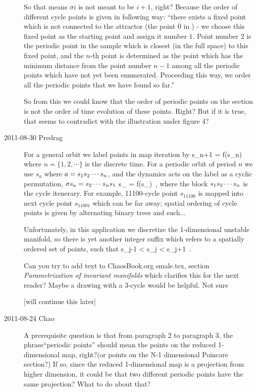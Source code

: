 \begin{description}
So that means $\sigma i$ is not meant to be $i+1$, right? Because the order of different cycle points is given in following way: ``there exists a fixed point which
is not connected to the attractor (the point
$\overline{0}$ in ) - we
choose this fixed point
as the starting point and assign it number $1$.
Point number $2$ is the periodic point in the sample
which is closest (in the full space)
to this fixed point, and the $n$-th point is determined as the point
which has the minimum distance from the point number $n-1$ among
all the periodic points which have not yet been enumerated.
Proceeding this way, we order all the periodic points that we have found
so far.''

So from this we could know that the order of periodic points on the section is not the order of time evolution of these points. Right? But if it is true, that seems to contradict with the illustration under figure 4?

\item[2011-08-30 Predrag] 
For a general orbit we  label points in map iteration by 
\beq
s_{n+1} = f(s_n)
where $n=\{1,2,\cdots\}$ is the discrete time.
For a periodic orbit of period $n$ we use $s_a$ 
where $a = {s_{1}}{s_{2}}\cdots{\ensuremath{s_{n}}}$, and the
dynamics acts on the label as a cyclic permutation,
$\sigma s_a = {s_{2}}\cdots{\ensuremath{s_{n}}}{\ensuremath{s_{1}}}$
\beq
s_{\cdots{}} = 
    f(s_{\cdots{}})
\,,
where the block ${s_{1}}{s_{2}}\cdots{\ensuremath{s_{n}}}$ is the
cycle itenerary.
For example, 11100-cycle point $s_{11100}$ is mapped into
next cycle point $s_{11001}$ which can be far away; spatial
ordering of cycle points is given by alternating binary trees
and such...

Unfortunately, in this application we discretize the 1-dimensional unstable manifold, so there is yet another integer
suffix which refers to a spatially ordered 
set of points, such that
\beq
s_{j-1} < s_{j} < s_{j+1}
\,.

Can you try to add text to ChaosBook.org 
smale.tex, section {\em Parametrization of invariant manifolds}
which clarifies this for the next reader? Maybe a drawing with
a 3-cycle would be helpful. Not sure

[will continue this later]


\item[2011-08-24 Chao]
A prerequisite question is that from paragraph 2 to paragraph 3, the phrase``periodic points'' should mean the points on the reduced 1-dimensional map, right?(or points on the N-1 dimensional Poincare section?) If so, since the reduced 1-dimensional map is a projection from higher dimension, it could be that two different periodic points have the same projection? What to do about that?



\end{description}
